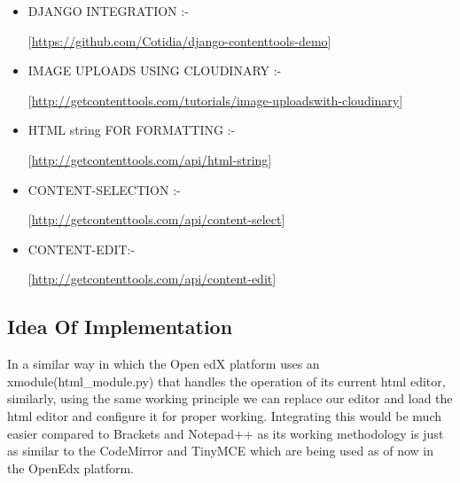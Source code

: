 \begin{itemize}
\begin{center}
\end{center}
\item DJANGO INTEGRATION :- 
\begin{center}
[\url{https://github.com/Cotidia/django-contenttools-demo}]
\end{center}
\item IMAGE UPLOADS USING CLOUDINARY :- 
\begin{center}
[\url{http://getcontenttools.com/tutorials/image-uploadswith-cloudinary}]
\end{center}
\item HTML string FOR FORMATTING :- 
\begin{center}
[\url{http://getcontenttools.com/api/html-string}]
\end{center}
\item CONTENT-SELECTION :- 
\begin{center}
[\url{http://getcontenttools.com/api/content-select}]
\end{center}
\item CONTENT-EDIT:- 
\begin{center}
[\url{http://getcontenttools.com/api/content-edit}]
\end{center}
\end{itemize}
\subsection{Idea Of Implementation}
In a similar way in which the Open edX platform uses an xmodule(html\_module.py) that
handles the operation of its current html editor, similarly, using the same working principle
we can replace our editor and load the html editor and configure it for proper working.  \newline
\newline
Integrating this would be much easier compared to Brackets and Notepad++ as its working
methodology is just as similar to the CodeMirror and TinyMCE which are being used as of
now in the OpenEdx platform. \newline
